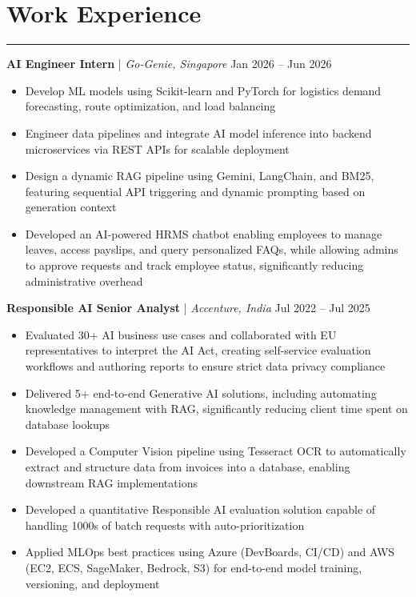 \documentclass[9pt]{extarticle}
\begin{document}
\section{Work Experience}
\vspace{-6pt}\hrule\vspace{4pt}
\textbf{AI Engineer Intern} | \textit{Go-Genie, Singapore} \hfill Jan 2026 -- Jun 2026 \\

\begin{itemize}
    \item Develop ML models using Scikit-learn and PyTorch for logistics demand forecasting, route optimization, and load balancing
    \item Engineer data pipelines and integrate AI model inference into backend microservices via REST APIs for scalable deployment
    \item Design a dynamic RAG pipeline using Gemini, LangChain, and BM25, featuring sequential API triggering and dynamic prompting based on generation context
    \item Developed an AI-powered HRMS chatbot enabling employees to manage leaves, access payslips, and query personalized FAQs, while allowing admins to approve requests and track employee status, significantly reducing administrative overhead
\end{itemize}

\vspace{2pt}
\textbf{Responsible AI Senior Analyst} | \textit{Accenture, India} \hfill Jul 2022 -- Jul 2025 \\

\begin{itemize}
    \item Evaluated 30+ AI business use cases and collaborated with EU representatives to interpret the AI Act, creating self-service evaluation workflows and authoring reports to ensure strict data privacy compliance
    \item Delivered 5+ end-to-end Generative AI solutions, including automating knowledge management with RAG, significantly reducing client time spent on database lookups
    \item Developed a Computer Vision pipeline using Tesseract OCR to automatically extract and structure data from invoices into a database, enabling downstream RAG implementations
    \item Developed a quantitative Responsible AI evaluation solution capable of handling 1000s of batch requests with auto-prioritization
    \item Applied MLOps best practices using Azure (DevBoards, CI/CD) and AWS (EC2, ECS, SageMaker, Bedrock, S3) for end-to-end model training, versioning, and deployment
\end{itemize}
\end{document}
